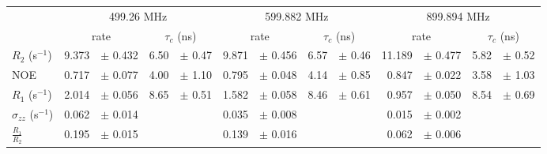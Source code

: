 \documentclass[showkeys,aps,prb,prepreint,amssymb, amsmath,nobibnotes]{article}
\begin{document}
\begin{small}
\noindent \begin{tabular}{l|rlrl|rlrl|rlrl}
& \multicolumn{4}{c}{499.26 MHz}& \multicolumn{4}{c}{599.882 MHz}& \multicolumn{4}{c}{899.894 MHz}\\
&  \multicolumn{2}{c}{rate} & \multicolumn{2}{c}{$\tau_c$ (ns)}   &  \multicolumn{2}{c}{rate} & \multicolumn{2}{c}{$\tau_c$ (ns)}   &  \multicolumn{2}{c}{rate} & \multicolumn{2}{c}{$\tau_c$ (ns)}   \\
\hline$R_2$  (s$^{-1}$)  &  9.373 & $\pm$ 0.432   &  6.50 & $\pm$ 0.47 &  9.871 & $\pm$ 0.456   &  6.57 & $\pm$ 0.46 &  11.189 & $\pm$ 0.477   &  5.82 & $\pm$ 0.52 \\
NOE  &  0.717 & $\pm$ 0.077   &  4.00 & $\pm$ 1.10 &  0.795 & $\pm$ 0.048   &  4.14 & $\pm$ 0.85 &  0.847 & $\pm$ 0.022   &  3.58 & $\pm$ 1.03 \\
$R_1$ (s$^{-1}$)  &  2.014 & $\pm$ 0.056   &  8.65 & $\pm$ 0.51 &  1.582 & $\pm$ 0.058   &  8.46 & $\pm$ 0.61 &  0.957 & $\pm$ 0.050   &  8.54 & $\pm$ 0.69 \\
$\sigma_{zz}$  (s$^{-1}$)  &  0.062 & $\pm$ 0.014   & & &  0.035 & $\pm$ 0.008   & & &  0.015 & $\pm$ 0.002   & & \\
$\frac{R_1}{R_2}$  &  0.195 & $\pm$ 0.015   & & &  0.139 & $\pm$ 0.016   & & &  0.062 & $\pm$ 0.006   & & \\
\end{tabular}
\end{small}
\end{document}
